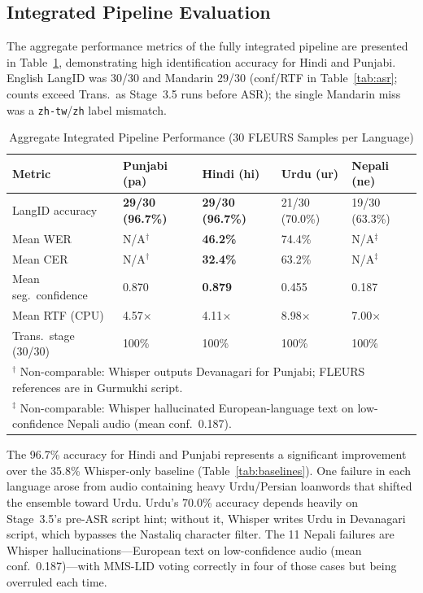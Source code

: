 \documentclass[conference]{IEEEtran}
\begin{document}
\subsection{Integrated Pipeline Evaluation}
\label{sec:largescale}

The aggregate performance metrics of the fully integrated pipeline are presented in Table~\ref{tab:largescale}, demonstrating high identification accuracy for Hindi and Punjabi. English LangID was 30/30 and Mandarin 29/30 (conf/RTF in Table~\ref{tab:asr}; counts exceed Trans.\ as Stage~3.5 runs before ASR); the single Mandarin miss was a \texttt{zh-tw}/\texttt{zh} label mismatch.

\begin{table}[htbp]
\caption{Aggregate Integrated Pipeline Performance (30 FLEURS Samples per Language)}
\label{tab:largescale}
\begin{center}
\begin{tabular}{lllll}
\toprule
\textbf{Metric} & \textbf{Punjabi (pa)} & \textbf{Hindi (hi)} & \textbf{Urdu (ur)} & \textbf{Nepali (ne)} \\
\midrule
LangID accuracy & \textbf{29/30 (96.7\%)} & \textbf{29/30 (96.7\%)} & 21/30 (70.0\%) & 19/30 (63.3\%) \\
Mean WER & N/A$^\dagger$ & \textbf{46.2\%} & 74.4\% & N/A$^\ddagger$ \\
Mean CER & N/A$^\dagger$ & \textbf{32.4\%} & 63.2\% & N/A$^\ddagger$ \\
Mean seg.\ confidence & 0.870 & \textbf{0.879} & 0.455 & 0.187 \\
Mean RTF (CPU) & 4.57$\times$ & 4.11$\times$ & 8.98$\times$ & 7.00$\times$ \\
Trans.\ stage (30/30) & 100\% & 100\% & 100\% & 100\% \\
\midrule
\multicolumn{5}{l}{\footnotesize $^\dagger$ Non-comparable: Whisper outputs Devanagari for Punjabi; FLEURS references are in Gurmukhi script.} \\
\multicolumn{5}{l}{\footnotesize $^\ddagger$ Non-comparable: Whisper hallucinated European-language text on low-confidence Nepali audio (mean conf.\ 0.187).} \\
\bottomrule
\end{tabular}
\end{center}
\end{table}

The 96.7\% accuracy for Hindi and Punjabi represents a significant improvement over the 35.8\% Whisper-only baseline (Table~\ref{tab:baselines}). One failure in each language arose from audio containing heavy Urdu/Persian loanwords that shifted the ensemble toward Urdu. Urdu's 70.0\% accuracy depends heavily on Stage~3.5's pre-ASR script hint; without it, Whisper writes Urdu in Devanagari script, which bypasses the Nastaliq character filter. The 11 Nepali failures are Whisper hallucinations---European text on low-confidence audio (mean conf.\ 0.187)---with MMS-LID voting correctly in four of those cases but being overruled each time.
\end{document}
